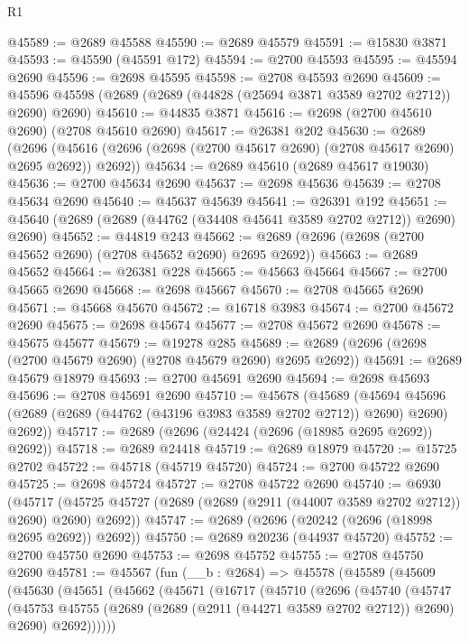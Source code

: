 \begin{lexlean}{R1}
\begin{coremodule}
@45589 := @2689 @45588
@45590 := @2689 @45579
@45591 := @15830 @3871
@45593 := @45590 (@45591 @172)
@45594 := @2700 @45593
@45595 := @45594 @2690
@45596 := @2698 @45595
@45598 := @2708 @45593 @2690
@45609 := @45596 @45598 (@2689 (@2689 (@44828 (@25694 @3871 @3589 @2702 @2712)) @2690) @2690)
@45610 := @44835 @3871
@45616 := @2698 (@2700 @45610 @2690) (@2708 @45610 @2690)
@45617 := @26381 @202
@45630 := @2689
    (@2696 (@45616 (@2696 (@2698 (@2700 @45617 @2690) (@2708 @45617 @2690) @2695 @2692)) @2692))
@45634 := @2689 @45610 (@2689 @45617 @19030)
@45636 := @2700 @45634 @2690
@45637 := @2698 @45636
@45639 := @2708 @45634 @2690
@45640 := @45637 @45639
@45641 := @26391 @192
@45651 := @45640 (@2689 (@2689 (@44762 (@34408 @45641 @3589 @2702 @2712)) @2690) @2690)
@45652 := @44819 @243
@45662 := @2689 (@2696 (@2698 (@2700 @45652 @2690) (@2708 @45652 @2690) @2695 @2692))
@45663 := @2689 @45652
@45664 := @26381 @228
@45665 := @45663 @45664
@45667 := @2700 @45665 @2690
@45668 := @2698 @45667
@45670 := @2708 @45665 @2690
@45671 := @45668 @45670
@45672 := @16718 @3983
@45674 := @2700 @45672 @2690
@45675 := @2698 @45674
@45677 := @2708 @45672 @2690
@45678 := @45675 @45677
@45679 := @19278 @285
@45689 := @2689 (@2696 (@2698 (@2700 @45679 @2690) (@2708 @45679 @2690) @2695 @2692))
@45691 := @2689 @45679 @18979
@45693 := @2700 @45691 @2690
@45694 := @2698 @45693
@45696 := @2708 @45691 @2690
@45710 := @45678
    (@45689
      (@45694 @45696 (@2689 (@2689 (@44762 (@43196 @3983 @3589 @2702 @2712)) @2690) @2690) @2692))
@45717 := @2689 (@2696 (@24424 (@2696 (@18985 @2695 @2692)) @2692))
@45718 := @2689 @24418
@45719 := @2689 @18979
@45720 := @15725 @2702
@45722 := @45718 (@45719 @45720)
@45724 := @2700 @45722 @2690
@45725 := @2698 @45724
@45727 := @2708 @45722 @2690
@45740 := @6930
    (@45717 (@45725 @45727 (@2689 (@2689 (@2911 (@44007 @3589 @2702 @2712)) @2690) @2690) @2692))
@45747 := @2689 (@2696 (@20242 (@2696 (@18998 @2695 @2692)) @2692))
@45750 := @2689 @20236 (@44937 @45720)
@45752 := @2700 @45750 @2690
@45753 := @2698 @45752
@45755 := @2708 @45750 @2690
@45781 := @45567
    (fun (__b : @2684) =>
    @45578
      (@45589
        (@45609
          (@45630
            (@45651
              (@45662
                (@45671
                  (@16717
                    (@45710
                      (@2696
                        (@45740
                          (@45747
                            (@45753
                              @45755
                              (@2689 (@2689 (@2911 (@44271 @3589 @2702 @2712)) @2690) @2690)
                              @2692))))))

\end{coremodule}
\end{lexlean}
